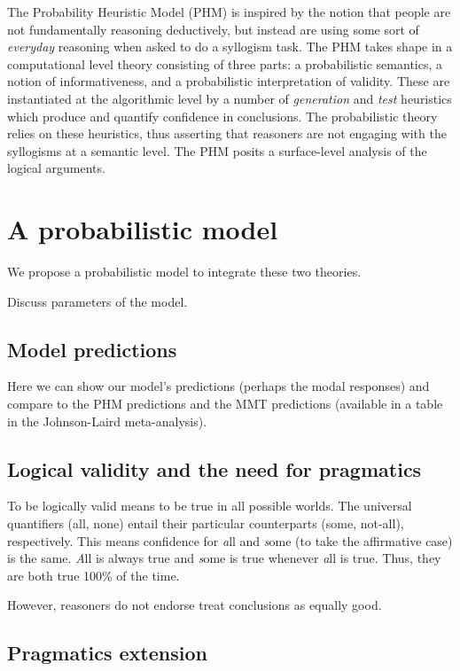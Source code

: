 \documentclass[10pt,letterpaper]{article}
\begin{document}
{The Probability Heuristic Model (PHM) is inspired by the notion that people are not fundamentally reasoning deductively, but instead are using some sort of {\em everyday} reasoning when asked to do a syllogism task. The PHM takes shape in a computational level theory consisting of three parts: a probabilistic semantics, a notion of informativeness, and a probabilistic interpretation of validity. These are instantiated at the algorithmic level by a number of {\em generation} and {\em test} heuristics which produce and quantify confidence in conclusions. The probabilistic theory relies on these heuristics, thus asserting that reasoners are not engaging with the syllogisms at a semantic level. The PHM posits a surface-level analysis of the logical arguments. 

\section{A probabilistic model}

We propose a probabilistic model to integrate these two theories. 

Discuss parameters of the model.

\subsection{Model predictions}

Here we can show our model's predictions (perhaps the modal responses) and compare to the PHM predictions and the MMT predictions (available in a table in the Johnson-Laird meta-analysis).

\subsection{Logical validity and the need for pragmatics}
To be logically valid means to be true in all possible worlds. The universal quantifiers (all, none) entail their particular counterparts (some, not-all), respectively. This means confidence for {\emph all} and {\emph some} (to take the affirmative case) is the same. {\emph All} is always true and {\emph some} is true whenever {\emph all} is true. Thus, they are both true 100\% of the time. 

However, reasoners do not endorse treat conclusions as equally good. 

\subsection{Pragmatics extension}

}
\end{document}
